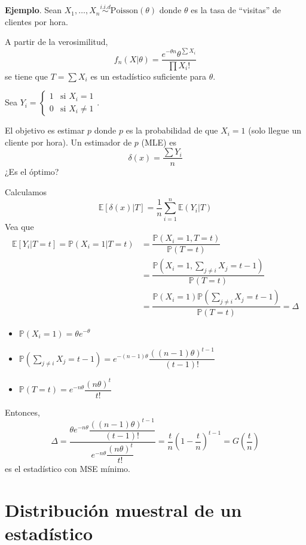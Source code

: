 \documentclass[
  12pt,
]{book}
\begin{document}
\textbf{Ejemplo}. Sean \(X_1,\dots, X_n \stackrel{i.i.d}{\sim} \text{Poisson}(\theta)\) donde \(\theta\) es la tasa de ``visitas'' de clientes por hora.

A partir de la verosimilitud,
\[f_n(X|\theta) = \dfrac{e^{-\theta n} \theta^{\sum X_i}}{\prod X_i!} \]
se tiene que \(T=\sum X_i\) es un estadístico suficiente para \(\theta\).

Sea \(Y_i = \begin{cases} 1 & \text{si } X_i = 1\\ 0 & \text{si } X_i \ne 1\end{cases}\).

El objetivo es estimar \(p\) donde \(p\) es la probabilidad de que \(X_i =1\) (solo llegue un cliente por hora). Un estimador de \(p\) (MLE) es
\[\delta(x) = \dfrac{\sum Y_i}{n}\]
¿Es el óptimo?

Calculamos
\[\mathbb E[\delta(x)|T] = \dfrac 1n \sum_{i=1}^n \mathbb E (Y_i|T)\]
Vea que
\begin{align*}
\mathbb E[Y_i|T = t] = \mathbb P(X_i = 1 | T = t) & = \dfrac{\mathbb P(X_i = 1, T=t)}{\mathbb P(T=t)}\\
& = \dfrac{\mathbb P(X_i = 1, \sum_{j\ne i} X_j = t-1)}{\mathbb P(T=t)}\\
& = \dfrac{\mathbb P(X_i = 1) \mathbb P(\sum_{j\ne i} X_j = t-1)}{\mathbb P(T=t)} = \Delta
\end{align*}

\begin{itemize}
\item
  \(\mathbb P(X_i = 1) = \theta e^{-\theta}\)
\item
  \(\mathbb P(\sum_{j\ne i}X_j = t-1) = e^{-(n-1)\theta}\dfrac{((n-1)\theta)^{t-1}}{(t-1)!}\)
\item
  \(\mathbb P(T=t) = e^{-n\theta}\dfrac{(n\theta)^t}{t!}\)
\end{itemize}

Entonces,
\[\Delta = \dfrac{\theta e^{-n\theta}\dfrac{((n-1)\theta)^{t-1}}{(t-1)!}}{e^{-n\theta}\dfrac{(n\theta)^t}{t!}} = \dfrac tn \left(1-\dfrac tn\right)^{t-1} = G\left(\dfrac tn\right)\]
es el estadístico con MSE mínimo.

\hypertarget{distribuciuxf3n-muestral-de-un-estaduxedstico}{%
\chapter{Distribución muestral de un estadístico}\label{distribuciuxf3n-muestral-de-un-estaduxedstico}}
\end{document}
